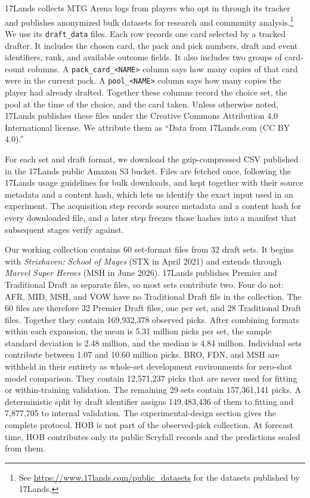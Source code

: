 \documentclass[11pt]{article}
\numberwithin{equation}{section}
\begin{document}
17Lands collects MTG Arena logs from players who opt in through its tracker and
publishes anonymized bulk datasets for research and community analysis.\footnote{See
\url{https://www.17lands.com/public_datasets} for the datasets
published by 17Lands.} We use its \texttt{draft\_data} files. Each row records
one card selected by a tracked drafter. It includes the chosen card, the pack
and pick numbers, draft and event identifiers, rank, and available outcome
fields. It also includes two groups of card-count columns. A
\texttt{pack\_card\_<NAME>} column says how many copies of that card were in the
current pack. A \texttt{pool\_<NAME>} column says how many copies the player had
already drafted. Together these columns record the choice set, the pool at the
time of the choice, and the card taken. Unless otherwise noted, 17Lands
publishes these files under the Creative Commons Attribution 4.0 International
license. We attribute them as ``Data from 17Lands.com (CC BY 4.0).''

For each set and draft format, we download the gzip-compressed CSV published in
the 17Lands public Amazon S3 bucket. Files are fetched once, following the
17Lands usage guidelines for bulk downloads, and kept together with their source
metadata and a content hash, which lets us identify the exact input used in an
experiment. The acquisition step records source metadata and a
content hash for every downloaded file, and a later step freezes those hashes
into a manifest that subsequent stages verify against.

Our working collection contains 60 set-format files from 32 draft sets. It
begins with \emph{Strixhaven: School of Mages} (STX in April 2021) and extends
through \emph{Marvel Super Heroes} (MSH in June 2026). 17Lands publishes
Premier and Traditional Draft as separate files, so most sets contribute two.
Four do not: AFR, MID, MSH, and VOW have no Traditional Draft file in the
collection. The 60 files are therefore 32 Premier Draft files, one per set, and
28 Traditional Draft files. Together they contain 169,932,378 observed
picks. After combining formats within each expansion, the mean is 5.31 million
picks per set, the sample standard deviation is 2.48 million, and the median is
4.84 million. Individual sets contribute between 1.07 and 10.60 million picks.
BRO, FDN, and MSH are withheld in their entirety as whole-set development
environments for zero-shot model comparison. They contain 12,571,237 picks
that are never used for fitting or within-training validation. The remaining
29 sets contain 157,361,141 picks. A deterministic split by
draft identifier assigns 149,483,436 of them to fitting and 7,877,705 to internal
validation. The experimental-design section gives the complete protocol.
HOB is not part of the observed-pick collection. At forecast time, HOB
contributes only its public Scryfall records and the predictions sealed from
them.
\end{document}
